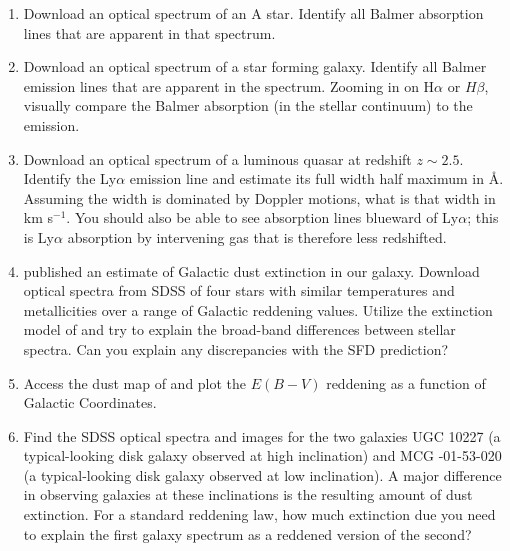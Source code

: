 \begin{enumerate}
\item Download an optical spectrum of an A star. Identify 
  all Balmer absorption lines that are apparent in that spectrum.
\item Download an optical spectrum of a star forming galaxy. Identify
all Balmer emission lines that are apparent in the spectrum. Zooming
in on H$\alpha$ or $H\beta$, visually compare the Balmer absorption
(in the stellar continuum) to the emission.
\item Download an optical spectrum of a luminous quasar at redshift $z\sim
2.5$. Identify the Ly$\alpha$ emission line and estimate its full
width half maximum in \AA. Assuming the width is dominated by Doppler
motions, what is that width in km s$^{-1}$. You should also be able to
see absorption lines blueward of Ly$\alpha$; this is Ly$\alpha$
absorption by intervening gas that is therefore less redshifted.
\item \citet{schlegel98a} published an estimate of Galactic dust
extinction in our galaxy. Download optical spectra from SDSS
of four stars with similar
temperatures and metallicities over a range of Galactic reddening
values. Utilize the extinction model of \citet{cardelli89a} and try to
explain the broad-band differences between stellar spectra. Can you
explain any discrepancies with the SFD prediction?
\item Access the dust map of \citet{schlegel98a} and plot the $E(B-V)$
    reddening as a function of Galactic Coordinates. 
\item Find the SDSS optical spectra and images for the two galaxies
UGC 10227 (a typical-looking disk galaxy observed at high inclination)
and MCG -01-53-020 (a typical-looking disk galaxy observed at low
inclination). A major difference in observing galaxies at these
inclinations is the resulting amount of dust extinction. For a
standard reddening law, how much extinction due you need to explain
the first galaxy spectrum as a reddened version of the second?
\end{enumerate}


  
